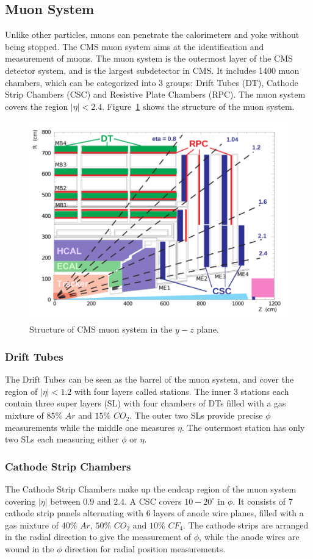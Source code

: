 \subsection{Muon System} 
Unlike other particles, muons can penetrate the calorimeters and yoke without being stopped. The CMS muon system aims at the identification and measurement of muons\cite{lhc_muondesign}. The muon system is the outermost layer of the CMS detector system, and is the largest subdetector in CMS. It includes 1400 muon chambers, which can be categorized into 3 groups: Drift Tubes (DT), Cathode Strip Chambers (CSC) and Resistive Plate Chambers (RPC). The muon system covers the region $|\eta|<2.4$. Figure~\ref{fig:lhc_muon} shows the structure of the muon system.
\begin{figure}[htbp]
\begin{center}
\includegraphics[width=0.7\linewidth]{figures/lhc_muon.pdf}
\caption{Structure of CMS muon system in the $y-z$ plane.}
\label{fig:lhc_muon}
\end{center}
\end{figure}

\subsubsection{Drift Tubes}
The Drift Tubes can be seen as the barrel of the muon system, and cover the region of $|\eta|<1.2$ with four layers called stations. The inner 3 stations each contain three super layers (SL) with four chambers of DTs filled with a gas mixture of $85\%$ $Ar$ and $15\%$ $CO_{2}$. The outer two SLs provide precise $\phi$ measurements while the middle one measures $\eta$. The outermost station has only two SLs each measuring either $\phi$ or $\eta$.

\subsubsection{Cathode Strip Chambers}
The Cathode Strip Chambers make up the endcap region of the muon system covering $|\eta|$ between $0.9$ and $2.4$. A CSC covers $10-20^{\circ}$ in $\phi$. It consists of 7 cathode strip panels alternating with 6 layers of anode wire planes, filled with a gas mixture of $40\%$ $Ar$, $50\%$ $CO_{2}$ and $10\%$ $CF_{4}$. The cathode strips are arranged in the radial direction to give the measurement of $\phi$, while the anode wires are wound in the $\phi$ direction for radial position measurements.


